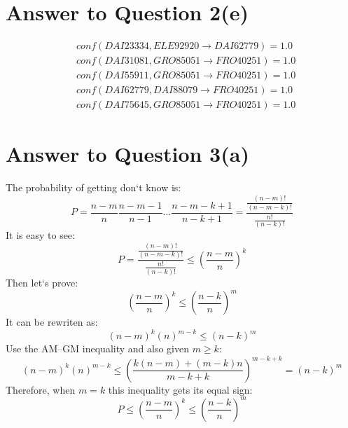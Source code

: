 \documentclass[11pt]{article}
\begin{document}
\pagebreak[4]
\section*{Answer to Question 2(e)}
\begin{equation*}
\begin{aligned}
& conf(DAI23334,ELE92920\rightarrow DAI62779) = 1.0\\
& conf(DAI31081,GRO85051\rightarrow FRO40251) = 1.0\\
& conf(DAI55911,GRO85051\rightarrow FRO40251) = 1.0\\
& conf(DAI62779,DAI88079\rightarrow FRO40251) = 1.0\\
& conf(DAI75645,GRO85051\rightarrow FRO40251) = 1.0
\end{aligned}
\end{equation*}


\pagebreak[4]
\section*{Answer to Question 3(a)}
The probability of getting don`t know is:\\
\begin{equation}
    P = \frac{n-m}{n}\frac{n-m-1}{n-1}...\frac{n-m-k+1}{n-k+1} =\frac{\frac{(n-m)!}{(n-m-k)!}}{\frac{n!}{(n-k)!}}
\end{equation}
It is easy to see:
\begin{equation}
    P = \frac{\frac{(n-m)!}{(n-m-k)!}}{\frac{n!}{(n-k)!}} \leq (\frac{n-m}{n})^k
\end{equation}
Then let`s prove:
\begin{equation}
    (\frac{n-m}{n})^k \leq (\frac{n-k}{n})^m
\end{equation}
It can be rewriten as:
\begin{equation}
    (n-m)^k(n)^{m-k} \leq (n-k)^m
\end{equation}
Use the AM–GM inequality and also given $m\geq k$:
\begin{equation}
    (n-m)^k(n)^{m-k} \leq (\frac{k(n-m)+(m-k)n}{m-k+k})^{m-k+k} = (n-k)^{m}
\end{equation}
Therefore, when $m=k$ this inequality gets its equal sign:
\begin{equation}
    P  \leq (\frac{n-m}{n})^k \leq (\frac{n-k}{n})^m
\end{equation}

\pagebreak[4]
\end{document}
